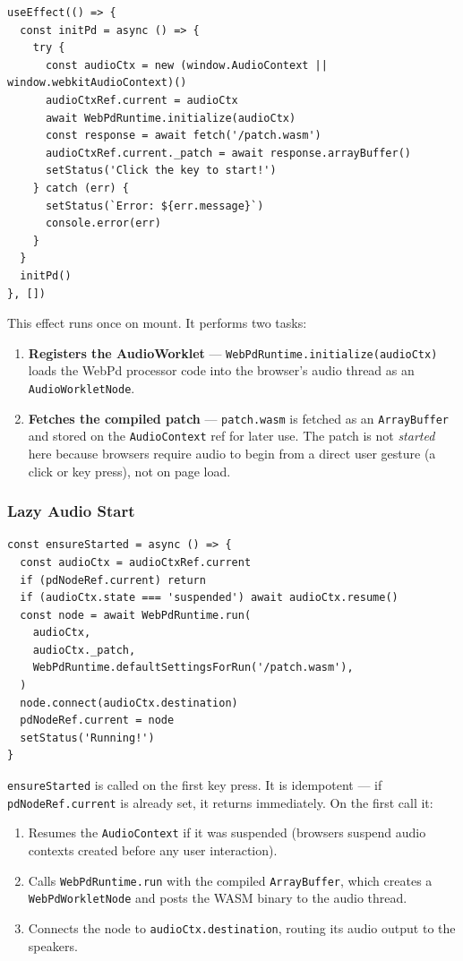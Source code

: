 \documentclass[12pt,a4paper]{article}
\begin{document}
\begin{lstlisting}[style=js, caption={useEffect initialisation}]
useEffect(() => {
  const initPd = async () => {
    try {
      const audioCtx = new (window.AudioContext || window.webkitAudioContext)()
      audioCtxRef.current = audioCtx
      await WebPdRuntime.initialize(audioCtx)
      const response = await fetch('/patch.wasm')
      audioCtxRef.current._patch = await response.arrayBuffer()
      setStatus('Click the key to start!')
    } catch (err) {
      setStatus(`Error: ${err.message}`)
      console.error(err)
    }
  }
  initPd()
}, [])
\end{lstlisting}

This effect runs once on mount. It performs two tasks:

\begin{enumerate}
  \item \textbf{Registers the AudioWorklet} — \texttt{WebPdRuntime.initialize(audioCtx)} loads the WebPd processor code into the browser's audio thread as an \texttt{AudioWorkletNode}.
  \item \textbf{Fetches the compiled patch} — \texttt{patch.wasm} is fetched as an \texttt{ArrayBuffer} and stored on the \texttt{AudioContext} ref for later use. The patch is not \emph{started} here because browsers require audio to begin from a direct user gesture (a click or key press), not on page load.
\end{enumerate}

\subsubsection{Lazy Audio Start}

\begin{lstlisting}[style=js, caption={ensureStarted}]
const ensureStarted = async () => {
  const audioCtx = audioCtxRef.current
  if (pdNodeRef.current) return
  if (audioCtx.state === 'suspended') await audioCtx.resume()
  const node = await WebPdRuntime.run(
    audioCtx,
    audioCtx._patch,
    WebPdRuntime.defaultSettingsForRun('/patch.wasm'),
  )
  node.connect(audioCtx.destination)
  pdNodeRef.current = node
  setStatus('Running!')
}
\end{lstlisting}

\texttt{ensureStarted} is called on the first key press. It is idempotent — if \texttt{pdNodeRef.current} is already set, it returns immediately. On the first call it:

\begin{enumerate}
  \item Resumes the \texttt{AudioContext} if it was suspended (browsers suspend audio contexts created before any user interaction).
  \item Calls \texttt{WebPdRuntime.run} with the compiled \texttt{ArrayBuffer}, which creates a \texttt{WebPdWorkletNode} and posts the WASM binary to the audio thread.
  \item Connects the node to \texttt{audioCtx.destination}, routing its audio output to the speakers.
\end{enumerate}
\end{document}

